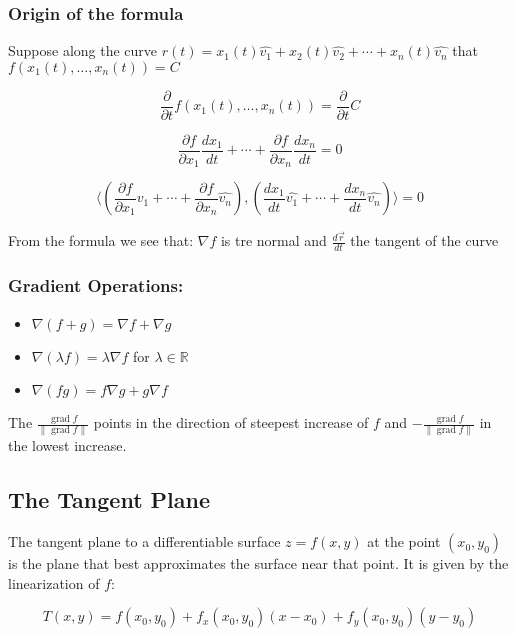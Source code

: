 \subsubsection{Origin of the formula}

Suppose along the curve \(r(t) = x_1(t)\hat{v_1} + x_2(t)\hat{v_2} + \cdots + x_n(t)\hat{v_n}\) that \(f(x_1(t), \dots, x_n(t)) = C\)

\[
\frac{\partial}{\partial t}f(x_1(t), \dots, x_n(t)) = \frac{\partial}{\partial t}C
\]

\[
\frac{\partial f}{\partial x_1}\frac{dx_1}{dt} + \cdots + \frac{\partial f}{\partial x_n}\frac{dx_n}{dt} = 0
\]

\[
\langle \left(\frac{\partial f}{\partial x_1}\hat{v_1} + \cdots + \frac{\partial f}{\partial x_n}\hat{v_n}\right) , \left( \frac{dx_1}{dt}\hat{v_1} + \cdots + \frac{dx_n}{dt}\hat{v_n}\right)\rangle = 0
\]

From the formula we see that: \(\nabla f\) is tre normal and \(\frac{d\vec{r}}{dt}\) the tangent of the curve

\QED

\subsubsection{Gradient Operations:}
\begin{itemize}[label=\(-\)]
\item \( \nabla(f + g) = \nabla f + \nabla g \)
\item \( \nabla(\lambda f) = \lambda \nabla f \) for \( \lambda \in \mathbb{R} \)
\item \( \nabla(fg) = f \nabla g + g \nabla f \)
\end{itemize}

The \(\frac{\operatorname{grad}f}{\|\operatorname{grad}f\|}\) points in the direction of steepest increase of \( f \) and
 \(- \frac{\operatorname{grad}f}{\|\operatorname{grad}f\|}\) in the lowest increase.



\subsection{The Tangent Plane}

The tangent plane to a differentiable surface \( z = f(x, y) \) at the point \( (x_0, y_0) \) is the plane that best approximates the surface near that point. It is given by the linearization of \( f \):

\[
T(x, y) = f(x_0, y_0) + f_x(x_0, y_0)(x - x_0) + f_y(x_0, y_0)(y - y_0)
\]

